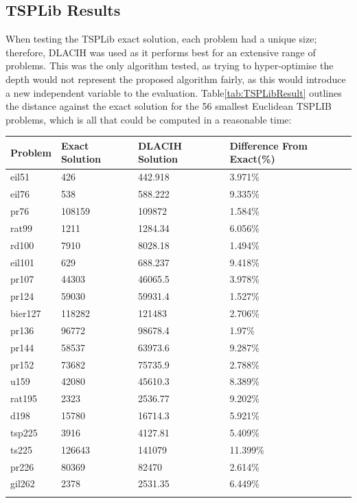 \subsection{TSPLib Results}

When testing the TSPLib exact solution, each problem had a unique size; therefore, DLACIH was used as it performs best for an extensive range of problems. This was the only algorithm tested, as trying to hyper-optimise the depth would not represent the proposed algorithm fairly, as this would introduce a new independent variable to the evaluation. Table\ref{tab:TSPLibResult} outlines the distance against the exact solution for the 56 smallest Euclidean TSPLIB problems, which is all that could be computed in a reasonable time:
\pagebreak
\begin{longtable}{|p{}|p{}|p{}|p{}|} 
\hline
{ \textbf{Problem}} & { \textbf{Exact Solution}} & { \textbf{DLACIH Solution}} & {\textbf{Difference From Exact(\%)}} \\ \hline
eil51 & 426 & 442.918 & 3.971\%  \\ \myrowcolour
eil76 & 538 & 588.222 & 9.335\%  \\ 
pr76 & 108159 & 109872 & 1.584\%  \\ \myrowcolour
rat99 & 1211 & 1284.34 & 6.056\%  \\ 
rd100 & 7910 & 8028.18 & 1.494\%  \\ \myrowcolour
eil101 & 629 & 688.237 & 9.418\%  \\
pr107 & 44303 & 46065.5 & 3.978\%  \\ \myrowcolour
pr124 & 59030 & 59931.4 & 1.527\%  \\ 
bier127 & 118282 & 121483 & 2.706\%  \\  \myrowcolour
pr136 & 96772 & 98678.4 & 1.97\%  \\ 
pr144 & 58537 & 63973.6 & 9.287\%  \\ \myrowcolour
pr152 & 73682 & 75735.9 & 2.788\%  \\ 
u159 & 42080 & 45610.3 & 8.389\%  \\ \myrowcolour
rat195 & 2323 & 2536.77 & 9.202\%  \\ 
d198 & 15780 & 16714.3 & 5.921\%  \\ \myrowcolour
tsp225 & 3916 & 4127.81 & 5.409\%  \\ 
ts225 & 126643 & 141079 & 11.399\%  \\ \myrowcolour
pr226 & 80369 & 82470 & 2.614\%  \\ 
gil262 & 2378 & 2531.35 & 6.449\%  \\ \myrowcolour

\end{longtable}
